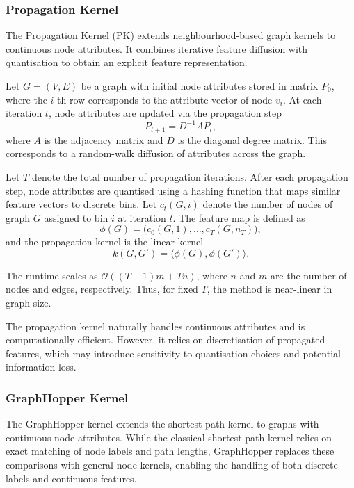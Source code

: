 \subsubsection{Propagation Kernel}
\label{sec:theory:propagation_kernel}

The Propagation Kernel (PK) \citep{neumann2016propagation}
extends neighbourhood-based graph kernels to continuous node attributes.
It combines iterative feature diffusion with quantisation
to obtain an explicit feature representation.

Let $G=(V,E)$ be a graph with initial node attributes stored in matrix $P_0$,
where the $i$-th row corresponds to the attribute vector of node $v_i$.
At each iteration $t$, node attributes are updated via the propagation step
\[
P_{t+1} = D^{-1} A P_t,
\]
where $A$ is the adjacency matrix and $D$ is the diagonal degree matrix.
This corresponds to a random-walk diffusion of attributes across the graph.

Let $T$ denote the total number of propagation iterations.
After each propagation step, node attributes are quantised using a hashing
function that maps similar feature vectors to discrete bins.
Let $c_t(G,i)$ denote the number of nodes of graph $G$ assigned to bin $i$
at iteration $t$.
The feature map is defined as
\[
\phi(G)
=
\big(
c_0(G,1), \dots, c_T(G,n_T)
\big),
\]
and the propagation kernel is the linear kernel
\[
k(G,G') = \langle \phi(G), \phi(G') \rangle.
\]

The runtime scales as
$\mathcal{O}((T-1)m + Tn)$,
where $n$ and $m$ are the number of nodes and edges, respectively.
Thus, for fixed $T$, the method is near-linear in graph size.

The propagation kernel naturally handles continuous attributes and is
computationally efficient. However, it relies on discretisation of propagated
features, which may introduce sensitivity to quantisation choices and potential
information loss.

\subsubsection{GraphHopper Kernel}
\label{sec:theory:graphhopper}

The GraphHopper kernel \citep{feragen2013scalable}
extends the shortest-path kernel to graphs with
continuous node attributes.
While the classical shortest-path kernel relies
on exact matching of node labels and path lengths,
GraphHopper replaces these comparisons with
general node kernels, enabling the handling
of both discrete labels and continuous features.

